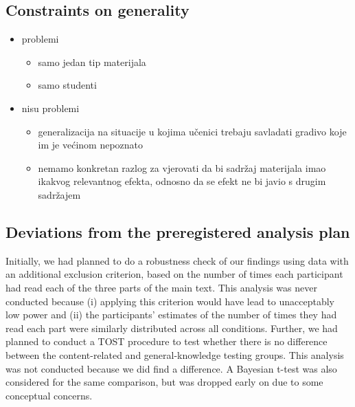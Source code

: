 \documentclass[
  11pt,
]{article}
\providecommand{\tightlist}{%
  \setlength{\itemsep}{0pt}\setlength{\parskip}{0pt}}
\begin{document}
\hypertarget{constraints-on-generality}{%
\subsection{Constraints on generality}\label{constraints-on-generality}}

\begin{itemize}
\tightlist
\item
  problemi

  \begin{itemize}
  \tightlist
  \item
    samo jedan tip materijala
  \item
    samo studenti
  \end{itemize}
\item
  nisu problemi

  \begin{itemize}
  \tightlist
  \item
    generalizacija na situacije u kojima učenici trebaju savladati
    gradivo koje im je većinom nepoznato
  \item
    nemamo konkretan razlog za vjerovati da bi sadržaj materijala imao
    ikakvog relevantnog efekta, odnosno da se efekt ne bi javio s drugim
    sadržajem
  \end{itemize}
\end{itemize}

\hypertarget{deviations-from-the-preregistered-analysis-plan}{%
\subsection{Deviations from the preregistered analysis
plan}\label{deviations-from-the-preregistered-analysis-plan}}

Initially, we had planned to do a robustness check of our findings using
data with an additional exclusion criterion, based on the number of
times each participant had read each of the three parts of the main
text. This analysis was never conducted because (i) applying this
criterion would have lead to unacceptably low power and (ii) the
participants' estimates of the number of times they had read each part
were similarly distributed across all conditions. Further, we had
planned to conduct a TOST procedure to test whether there is no
difference between the content-related and general-knowledge testing
groups. This analysis was not conducted because we did find a
difference. A Bayesian t-test was also considered for the same
comparison, but was dropped early on due to some conceptual concerns.
\end{document}
